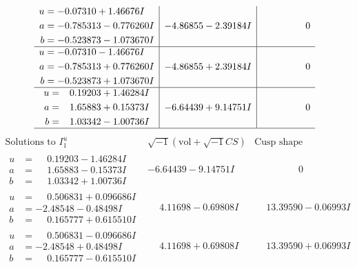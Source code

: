 \documentclass[1p]{elsarticle_modified}
\theoremstyle{definition}
\newcommand{\I}{\sqrt{-1}}
\begin{document}
$$\begin{array}{c|c|c}
\begin{aligned}
u &= -0.07310 + 1.46676 I \\
a &= -0.785313 - 0.776260 I \\
b &= -0.523873 - 1.073670 I\end{aligned}
 & -4.86855 - 2.39184 I & \phantom{-0.000000 } 0 \\ \hline\begin{aligned}
u &= -0.07310 - 1.46676 I \\
a &= -0.785313 + 0.776260 I \\
b &= -0.523873 + 1.073670 I\end{aligned}
 & -4.86855 + 2.39184 I & \phantom{-0.000000 } 0 \\ \hline\begin{aligned}
u &= \phantom{-}0.19203 + 1.46284 I \\
a &= \phantom{-}1.65883 + 0.15373 I \\
b &= \phantom{-}1.03342 - 1.00736 I\end{aligned}
 & -6.64439 + 9.14751 I & \phantom{-0.000000 } 0\\
 \hline 
 \end{array}$$\newpage$$\begin{array}{c|c|c}  
\text{Solutions to }I^u_{1}& \I (\text{vol} + \sqrt{-1}CS) & \text{Cusp shape}\\
 \hline 
\begin{aligned}
u &= \phantom{-}0.19203 - 1.46284 I \\
a &= \phantom{-}1.65883 - 0.15373 I \\
b &= \phantom{-}1.03342 + 1.00736 I\end{aligned}
 & -6.64439 - 9.14751 I & \phantom{-0.000000 } 0 \\ \hline\begin{aligned}
u &= \phantom{-}0.506831 + 0.096686 I \\
a &= -2.48548 - 0.48498 I \\
b &= \phantom{-}0.165777 + 0.615510 I\end{aligned}
 & \phantom{-}4.11698 - 0.69808 I & \phantom{-}13.39590 - 0.06993 I \\ \hline\begin{aligned}
u &= \phantom{-}0.506831 - 0.096686 I \\
a &= -2.48548 + 0.48498 I \\
b &= \phantom{-}0.165777 - 0.615510 I\end{aligned}
 & \phantom{-}4.11698 + 0.69808 I & \phantom{-}13.39590 + 0.06993 I \\ \hline\begin{aligned}

\end{aligned}
\end{array}$$
\end{document}
